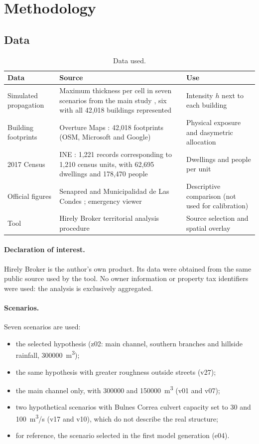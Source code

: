 \documentclass[10pt,a4paper]{article}
\begin{document}
\section{Methodology}
\subsection{Data}
\begin{table}[htbp]\centering\small
\caption{Data used.}\label{tab:datos}
\begin{tabular}{p{}p{}p{}}\toprule
Data & Source & Use\\\midrule
Simulated propagation & Maximum thickness per cell in seven scenarios from the main study \citep{wood2026}, six with all 42,018 buildings represented & Intensity $h$ next to each building\\
Building footprints & Overture Maps \citep{overture2026}: 42,018 footprints (OSM, Microsoft and Google) & Physical exposure and dasymetric allocation\\
2017 Census & INE \citep{ine2017manzanas}: 1,221 records corresponding to 1,210 census units, with 62,695 dwellings and 178,470 people & Dwellings and people per unit\\
Official figures & Senapred and Municipalidad de Las Condes \citep{senapred2026latribuna,cnn2026balance,latercera2026senapred}; emergency viewer \citep{bbnn2026visor} & Descriptive comparison (not used for calibration)\\
Tool & Hirely Broker territorial analysis procedure \citep{hirelybroker2026} & Source selection and spatial overlay\\
\bottomrule\end{tabular}\end{table}

\paragraph{Declaration of interest.} Hirely Broker is the author's own product. Its data were obtained from the same public source used by the tool. No owner information or property tax identifiers were used: the analysis is exclusively aggregated.

\paragraph{Scenarios.} Seven scenarios are used:
\begin{itemize}
\item the selected hypothesis (z02: main channel, southern branches and hillside rainfall, \SI{300000}{m^3});
\item the same hypothesis with greater roughness outside streets (v27);
\item the main channel only, with \num{300000} and \SI{150000}{m^3} (v01 and v07);
\item two hypothetical scenarios with Bulnes Correa culvert capacity set to 30 and \SI{100}{m^3/s} (v17 and v10), which do not describe the real structure;
\item for reference, the scenario selected in the first model generation (e04).
\end{itemize}
\end{document}
